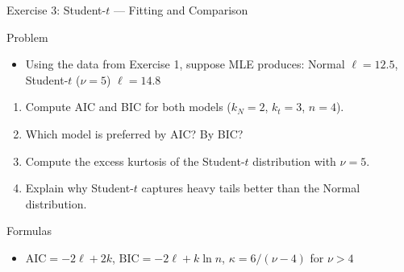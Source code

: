 \documentclass[9pt, aspectratio=169, t]{beamer}
\theoremstyle{definition}
\begin{document}
\begin{frame}{Exercise 3: Student-$t$ --- Fitting and Comparison}
\begin{block}{Problem}
\begin{itemize}
\item Using the data from Exercise 1, suppose MLE produces: Normal $\ell = 12.5$, Student-$t$ ($\nu = 5$) $\ell = 14.8$
\end{itemize}
\end{block}
\begin{enumerate}
    \item Compute AIC and BIC for both models ($k_N = 2$, $k_t = 3$, $n = 4$).
    \item Which model is preferred by AIC? By BIC?
    \item Compute the excess kurtosis of the Student-$t$ distribution with $\nu = 5$.
    \item Explain why Student-$t$ captures heavy tails better than the Normal distribution.
\end{enumerate}
\vspace{0.1cm}
\begin{alertblock}{Formulas}
\begin{itemize}
\item $\text{AIC} = -2\ell + 2k$, \quad $\text{BIC} = -2\ell + k\ln n$, \quad $\kappa = 6/(\nu - 4)$ for $\nu > 4$
\end{itemize}
\end{alertblock}
\end{frame}
\end{document}
